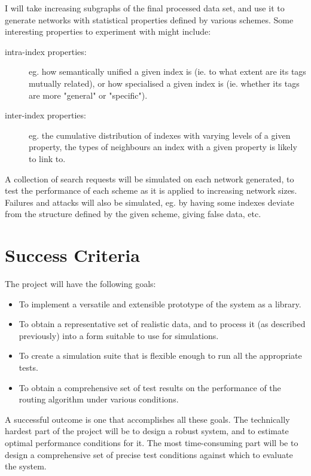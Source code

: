 \documentclass[12pt]{article}
\begin{document}
I will take increasing subgraphs of the final processed data set, and use it to
generate networks with statistical properties defined by various schemes. Some
interesting properties to experiment with might include:

\begin{description}
\item [intra-index properties:] eg. how semantically unified a given index is
    (ie. to what extent are its tags mutually related), or how specialised a
    given index is (ie. whether its tags are more "general" or "specific").
\item [inter-index properties:] eg. the cumulative distribution of indexes with
    varying levels of a given property, the types of neighbours an index with a
    given property is likely to link to.
\end{description}

A collection of search requests will be simulated on each network generated, to
test the performance of each scheme as it is applied to increasing network
sizes. Failures and attacks will also be simulated, eg. by having some indexes
deviate from the structure defined by the given scheme, giving false data, etc.


\section*{Success Criteria}

The project will have the following goals:

\begin{itemize}
\item To implement a versatile and extensible prototype of the system as a
    library.
\item To obtain a representative set of realistic data, and to process it (as
    described previously) into a form suitable to use for simulations.
\item To create a simulation suite that is flexible enough to run all the
    appropriate tests.
\item To obtain a comprehensive set of test results on the performance of the
    routing algorithm under various conditions.
\end{itemize}

A successful outcome is one that accomplishes all these goals. The technically
hardest part of the project will be to design a robust system, and to estimate
optimal performance conditions for it. The most time-consuming part will be to
design a comprehensive set of precise test conditions against which to evaluate
the system.
\end{document}
